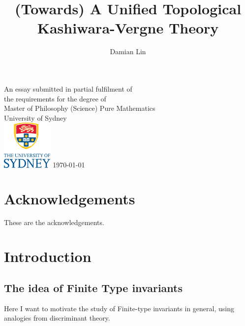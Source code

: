 \documentclass[12pt]{report}
\theoremstyle{regular}
\newcommand{\draftnote}[1]{
\begin{mdframed}[style=draftnote]
        {\color{Gray}{\scshape Note:} #1 }
\end{mdframed}
}
\begin{document}

        \author{Damian Lin}
        \title{(Towards) A Unified Topological Kashiwara-Vergne Theory}

        \cleardoublepage \thispagestyle{empty}
        \null \vfil
        \begingroup
        \LARGE \bfseries \centering
        \openup \medskipamount
        \thetitle \par \vspace{30pt}
        \centering \mdseries \theauthor \par \bigskip
        \endgroup
        \vfil \vfil \vfil
        \begin{center}
                An essay submitted in partial fulfilment of\\
                the requirements for the degree of\\
                Master of Philosophy (Science)
                \vfil\vfil
                {\large Pure Mathematics\\[5pt]
                        University of Sydney}\\
                \vskip6mm
                \includegraphics[width=25mm]{graphics/USY_MB1_CMYK_Stacked_Logo.pdf}
                \vfil
                \normalsize\today
        \end{center}
        \vfil
        \cleardoublepage

        \tableofcontents

        \chapter*{Acknowledgements}

        These are the acknowledgements.

        \chapter*{Introduction}

        \section*{The idea of Finite Type invariants}
        \draftnote{Here I want to motivate the study of Finite-type invariants in general, using analogies from discriminant theory.}
\end{document}
